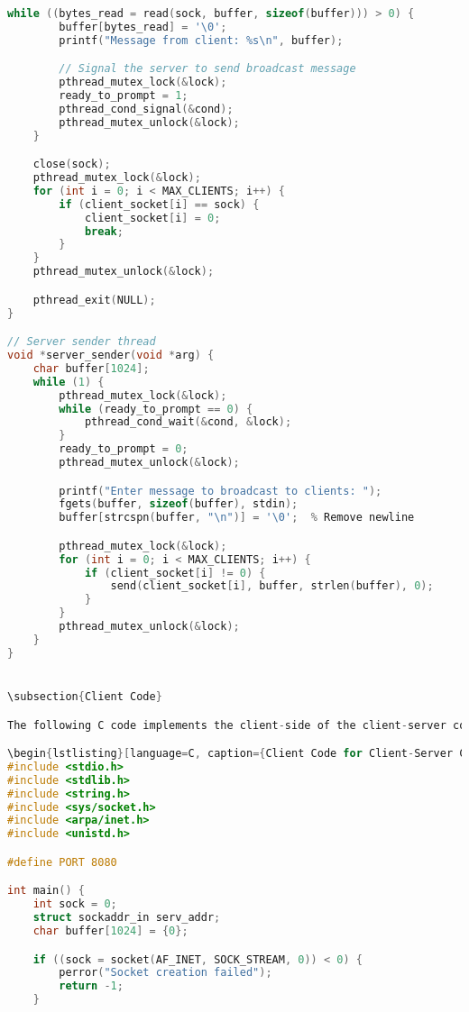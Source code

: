 \documentclass[12pt]{article}
\begin{document}
\begin{lstlisting}[language=C, caption={Server Code for Client-Server Communication}]
    while ((bytes_read = read(sock, buffer, sizeof(buffer))) > 0) {
        buffer[bytes_read] = '\0';
        printf("Message from client: %s\n", buffer);

        // Signal the server to send broadcast message
        pthread_mutex_lock(&lock);
        ready_to_prompt = 1;
        pthread_cond_signal(&cond);
        pthread_mutex_unlock(&lock);
    }

    close(sock);
    pthread_mutex_lock(&lock);
    for (int i = 0; i < MAX_CLIENTS; i++) {
        if (client_socket[i] == sock) {
            client_socket[i] = 0;
            break;
        }
    }
    pthread_mutex_unlock(&lock);

    pthread_exit(NULL);
}

// Server sender thread
void *server_sender(void *arg) {
    char buffer[1024];
    while (1) {
        pthread_mutex_lock(&lock);
        while (ready_to_prompt == 0) {
            pthread_cond_wait(&cond, &lock);
        }
        ready_to_prompt = 0;
        pthread_mutex_unlock(&lock);

        printf("Enter message to broadcast to clients: ");
        fgets(buffer, sizeof(buffer), stdin);
        buffer[strcspn(buffer, "\n")] = '\0';  % Remove newline

        pthread_mutex_lock(&lock);
        for (int i = 0; i < MAX_CLIENTS; i++) {
            if (client_socket[i] != 0) {
                send(client_socket[i], buffer, strlen(buffer), 0);
            }
        }
        pthread_mutex_unlock(&lock);
    }
}


\subsection{Client Code}

The following C code implements the client-side of the client-server communication program.

\begin{lstlisting}[language=C, caption={Client Code for Client-Server Communication}]
#include <stdio.h>
#include <stdlib.h>
#include <string.h>
#include <sys/socket.h>
#include <arpa/inet.h>
#include <unistd.h>

#define PORT 8080

int main() {
    int sock = 0;
    struct sockaddr_in serv_addr;
    char buffer[1024] = {0};

    if ((sock = socket(AF_INET, SOCK_STREAM, 0)) < 0) {
        perror("Socket creation failed");
        return -1;
    }


\end{lstlisting}
\end{document}
